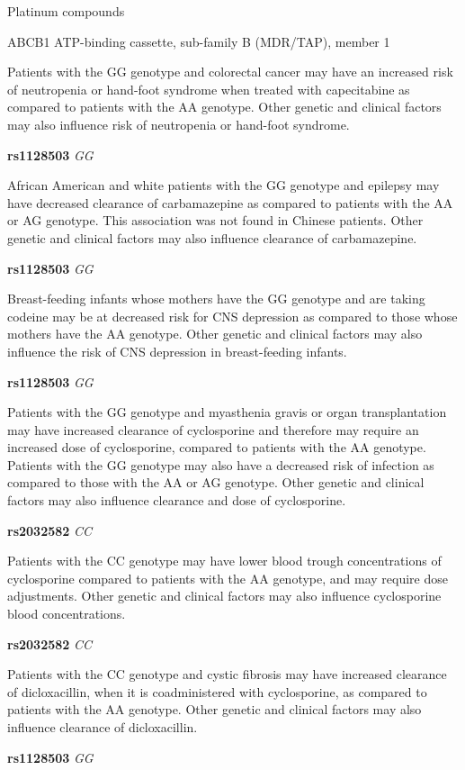 \documentclass{resume} %
\begin{document}
\begin{rSection}{ Platinum compounds }
\begin{rSubsection}{ ABCB1 }{ ATP-binding cassette, sub-family B (MDR/TAP), member 1 }{}{}
\item[] Patients with the GG genotype and colorectal cancer may have an increased risk of neutropenia or hand-foot syndrome when treated with capecitabine as compared to patients with the AA genotype. Other genetic and clinical factors may also influence risk of neutropenia or hand-foot syndrome.\item \textbf{ rs1128503 } \textit{ GG }
\item[] African American and white patients with the GG genotype and epilepsy may have decreased clearance of carbamazepine as compared to patients with the AA or AG genotype. This association was not found in Chinese patients. Other genetic and clinical factors may also influence clearance of carbamazepine.\item \textbf{ rs1128503 } \textit{ GG }
\item[] Breast-feeding infants whose mothers have the GG genotype and are taking codeine may be at decreased risk for CNS depression as compared to those whose mothers have the AA genotype. Other genetic and clinical factors may also influence the risk of CNS depression in breast-feeding infants. \item \textbf{ rs1128503 } \textit{ GG }
\item[] Patients with the GG genotype and myasthenia gravis or organ transplantation may have increased clearance of cyclosporine and therefore may require an increased dose of cyclosporine, compared to patients with the AA genotype. Patients with the GG genotype may also have a decreased risk of infection as compared to those with the AA or AG genotype. Other genetic and clinical factors may also influence clearance and dose of cyclosporine.\item \textbf{ rs2032582 } \textit{ CC }
\item[] Patients with the CC genotype may have lower blood trough concentrations of cyclosporine compared to patients with the AA genotype, and may require dose adjustments. Other genetic and clinical factors may also influence cyclosporine blood concentrations.\item \textbf{ rs2032582 } \textit{ CC }
\item[] Patients with the CC genotype and cystic fibrosis may have increased clearance of dicloxacillin, when it is coadministered with cyclosporine, as compared to patients with the AA genotype. Other genetic and clinical factors may also influence clearance of dicloxacillin.\item \textbf{ rs1128503 } \textit{ GG }

\end{rSubsection}
\end{rSection}
\end{document}
